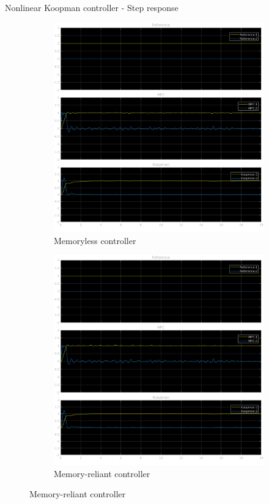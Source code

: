 \documentclass{beamer}
\begin{document}
\begin{frame}{Nonlinear Koopman controller - Step response}
    \begin{figure}
        \centering
        \begin{subfigure}[b]{0.45\textwidth}
            \centering
            \includegraphics[width=\textwidth]{Undelayed_Koopman_Step.png}
            \caption{Memoryless controller}
        \end{subfigure}
        \hfill
        \begin{subfigure}[b]{0.45\textwidth}
            \centering
            \includegraphics[width=\textwidth]{Delayed_Koopman_Step.png}
            \caption{Memory-reliant controller}
        \end{subfigure}
    \end{figure}
\end{frame}
\end{document}

